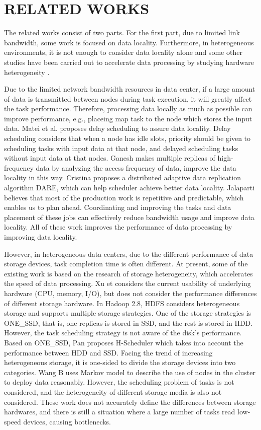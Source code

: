 \documentclass[conference]{IEEEtran}
\begin{document}
\section{RELATED WORKS}\label{RELATED_WORKS}
The related works consist of two parts. For the first part, due to limited link bandwidth, some work is focused on data locality. Furthermore, in heterogeneous environments, it is not enough to consider data locality alone and some other studies have been carried out to accelerate data processing by studying hardware heterogeneity \cite{b1}.

Due to the limited network bandwidth resources in data center, if a large amount of data is transmitted between nodes during task execution, it will greatly affect the task performance. Therefore, processing data locally as much as possible can improve performance, e.g., placeing map task to the node which stores the input data. Matei et al. \cite{b2} proposes delay scheduling to assure data locality. Delay scheduling considers that when a node has idle slots, priority should be given to scheduling tasks with input data at that node, and delayed scheduling tasks without input data at that nodes. Ganesh \cite{b3} makes multiple replicas of high-frequency data by analyzing the access frequency of data, improve the data locality in this way. Cristina \cite{b4} proposes a distributed adaptive data replication algorithm DARE, which can help scheduler achieve better data locality. Jalaparti \cite{b5} believes that most of the production work is repetitive and predictable, which enables us to plan ahead. Coordinating and improving the tasks and data placement of these jobs can effectively reduce bandwidth usage and improve data locality. All of these work improves the performance of data processing by improving data locality.

However, in heterogeneous data centers, due to the different performance of data storage devices, task completion time is often different. At present, some of the existing work is based on the research of storage heterogeneity, which accelerates the speed of data processing. Xu et \cite{b6} considers the current usability of underlying hardware (CPU, memory, I/O), but does not consider the performance differences of different storage hardware. 
In Hadoop 2.8, HDFS\cite{b19} considers heterogeneous storage and supports multiple storage strategies. One of the storage strategies is ONE\_SSD, that is, one replicas is stored in SSD, and the rest is stored in HDD. However, the task scheduling strategy is not aware of the disk's performance.
Based on ONE\_SSD, Pan \cite{b7} proposes H-Scheduler which takes into account the performance between HDD and SSD. Facing the trend of increasing heterogeneous storage, it is one-sided to divide the storage devices into two categories. Wang B \cite{b8} uses Markov model to describe the use of nodes in the cluster to deploy data reasonably. However, the scheduling problem of tasks is not considered, and the heterogeneity of different storage media is also not considered. These work does not accurately define the differences between storage hardwares, and there is still a situation where a large number of tasks read low-speed devices, causing bottlenecks.
\end{document}
